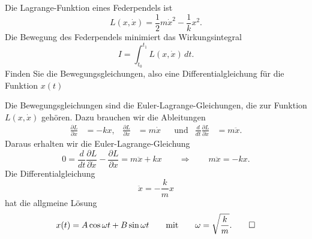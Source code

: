 Die Lagrange-Funktion eines Federpendels ist
\[
L(x,\dot x) = \frac12m\dot x^2 - \frac1kx^2.
\]
Die Bewegung des Federpendels minimiert das Wirkungsintegral
\[
I
=
\int_{t_0}^{t_1} L(x,\dot x)\,dt.
\]
Finden Sie die Bewegungsgleichungen, also eine Differentialgleichung
für die Funktion $x(t)$

\begin{loesung}
Die Bewegungsgleichungen sind die Euler-Lagrange-Gleichungen, die zur
Funktion $L(x,\dot x)$ gehören.
Dazu brauchen wir die Ableitungen
\[
\begin{aligned}
\frac{\partial L}{\partial x}
&=
-kx,
&
\frac{\partial L}{\partial \dot x}
&=
m\dot x
&&\text{und}&
\frac{d}{dt}\frac{\partial L}{\partial\dot x}
&=
m\ddot x.
\end{aligned}
\]
Daraus erhalten wir die Euler-Lagrange-Gleichung
\[
0
=
\frac{d}{dt}\frac{\partial L}{\partial\dot x}
-\frac{\partial L}{\partial x}
=
m\ddot x+kx
\qquad\Rightarrow\qquad
m\ddot x=-kx.
\]
Die Differentialgleichung
\[
\ddot x = -\frac{k}{m}x
\]
hat die allgmeine Lösung
\[
x(t)=A\cos\omega t + B\sin\omega t
\qquad\text{mit}\qquad
\omega=\sqrt{\frac{k}{m}}.
\qedhere
\]
\end{loesung}

